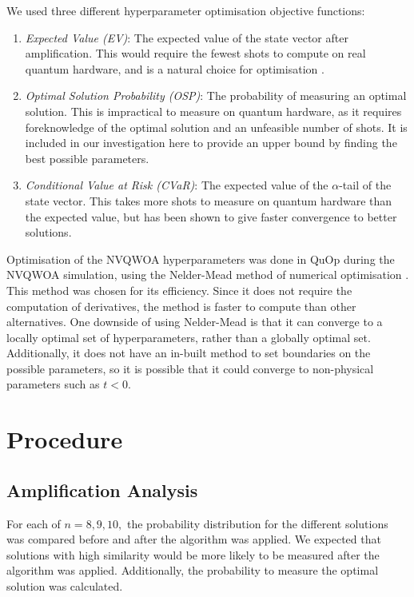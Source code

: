 We used three different hyperparameter optimisation objective functions:
\begin{enumerate}
    \item \textit{Expected Value (EV)}: The expected value of the state vector after amplification. This would require the fewest shots to compute on real quantum hardware, and is a natural choice for optimisation \cite{cvar_opt}.
    \item \textit{Optimal Solution Probability (OSP)}: The probability of measuring an optimal solution. This is impractical to measure on quantum hardware, as it requires foreknowledge of the optimal solution and an unfeasible number of shots. It is included in our investigation here to provide an upper bound by finding the best possible parameters.
    \item \textit{Conditional Value at Risk (CVaR)}: The expected value of the $\alpha$-tail of the state vector. This takes more shots to measure on quantum hardware than the expected value, but has been shown to give faster convergence to better solutions\cite{CVaR_quantum}.
\end{enumerate}
Optimisation of the NVQWOA hyperparameters was done in QuOp during the NVQWOA simulation, using the Nelder-Mead method of numerical optimisation \cite{nelder_mead}. This method was chosen for its efficiency. Since it does not require the computation of derivatives, the method is faster to compute than other alternatives. One downside of using Nelder-Mead is that it can converge to a locally optimal set of hyperparameters, rather than a globally optimal set. Additionally, it does not have an in-built method to set boundaries on the possible parameters, so it is possible that it could converge to non-physical parameters such as $t<0$.

\section{Procedure}
    \subsection{Amplification Analysis}
For each of $n=8,9,10,$ the probability distribution for the different solutions was compared before and after the algorithm was applied. We expected that solutions with high similarity would be more likely to be measured after the algorithm was applied. Additionally, the probability to measure the optimal solution was calculated.


